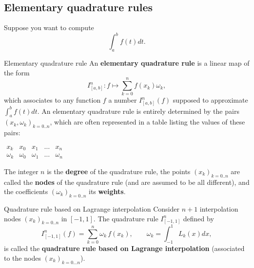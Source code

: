 \documentclass{article}
\begin{document}
        \subsection{Elementary quadrature rules}
    
        Suppose you want to compute
            $$
            \int_a^b f(t)dt.
            $$
    
        \vspace{2pt}
    
        \begin{definition}{Elementary quadrature rule}
            An \textbf{elementary quadrature rule} is a linear map of the form
            $$
            I^n_{[a,b]}: f \mapsto \sum_{k=0}^n f(x_k)\omega_k,
            $$
            which associates to any function $f$ a number $I^n_{[a,b]}(f)$ supposed to approximate $\int_a^b f(t) dt$. An elementary quadrature rule is entirely determined by the pairs $(x_k,\omega_k)_{k=0..n}$, which are often represented in a table listing the values of these pairs:
            \begin{center}
                $\begin{array}{c|cccc}
                    x_k & x_0 & x_1 & \ldots & x_n \\ \hline
                    \omega_k & \omega_0 & \omega_1 & \ldots & \omega_n 
                \end{array}$
            \end{center}
            
            The integer $n$ is the \textbf{degree} of the quadrature rule, the points $(x_k)_{k=0..n}$ are called the \textbf{nodes} of the quadrature rule (and are assumed to be all different), and the coefficients $(\omega_k)_{k=0..n}$ its \textbf{weights}.
        \end{definition}

        \vspace{10pt}

        \begin{definition}{Quadrature rule based on Lagrange interpolation}
            Consider $n+1$ interpolation nodes $(x_k)_{k=0..n}$ in $[-1,1]$. The quadrature rule $I^n_{[-1,1]}$ defined by
            $$
            I^n_{[-1,1]}(f) = \sum_{k=0}^{n}\omega_k\,f(x_k), \qquad{} \omega_k = \int_{-1}^1 L_k(x) dx,
            $$
            is called the \textbf{quadrature rule based on Lagrange interpolation} (associated to the nodes $(x_k)_{k=0...n}$).
        \end{definition}
\end{document}
